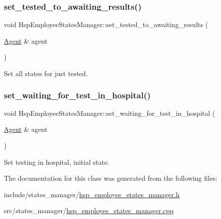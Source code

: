 \subsubsection{\texorpdfstring{set\+\_\+tested\+\_\+to\+\_\+awaiting\+\_\+results()}{set\_tested\_to\_awaiting\_results()}}
{\footnotesize\ttfamily void Hsp\+Employee\+States\+Manager\+::set\+\_\+tested\+\_\+to\+\_\+awaiting\+\_\+results (\begin{DoxyParamCaption}\item[{\hyperlink{classAgent}{Agent} \&}]{agent }\end{DoxyParamCaption})}



Set all states for just tested. 

\mbox{\label{classHspEmployeeStatesManager_a76dfcc6cd9c617f881bc44984a673174}} 
\subsubsection{\texorpdfstring{set\+\_\+waiting\+\_\+for\+\_\+test\+\_\+in\+\_\+hospital()}{set\_waiting\_for\_test\_in\_hospital()}}
{\footnotesize\ttfamily void Hsp\+Employee\+States\+Manager\+::set\+\_\+waiting\+\_\+for\+\_\+test\+\_\+in\+\_\+hospital (\begin{DoxyParamCaption}\item[{\hyperlink{classAgent}{Agent} \&}]{agent }\end{DoxyParamCaption})}



Set testing in hospital, initial state. 



The documentation for this class was generated from the following files\+:\begin{DoxyCompactItemize}
\item 
include/states\+\_\+manager/\hyperlink{hsp__employee__states__manager_8h}{hsp\+\_\+employee\+\_\+states\+\_\+manager.\+h}\item 
src/states\+\_\+manager/\hyperlink{hsp__employee__states__manager_8cpp}{hsp\+\_\+employee\+\_\+states\+\_\+manager.\+cpp}\end{DoxyCompactItemize}
